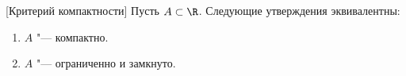 [Критерий компактности]\label{kk}
        Пусть $A\subset\R$. Следующие утверждения эквивалентны:

        \begin{enumerate}
            \item $A$ "--- компактно.

            \item $A$ "--- ограниченно и замкнуто.
        \end{enumerate}

